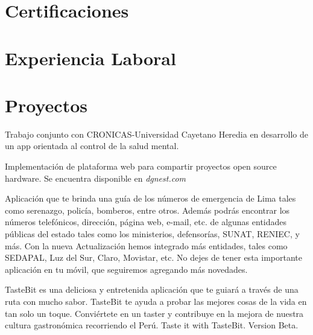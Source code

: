 \documentclass[11pt,a4paper,sans]{moderncv}
\begin{document}
\section{Certificaciones}
{} 

{}  

{}  



\section{Experiencia Laboral}
{} 

{} 

{}  



\section{Proyectos}
{Trabajo conjunto con CRONICAS-Universidad Cayetano Heredia en desarrollo de un app orientada al control de la salud mental.}  

{Implementación de plataforma web para compartir proyectos open source hardware. Se encuentra disponible en \emph{dgnest.com}}  

{Aplicación que te brinda una guía de los números de emergencia de Lima tales como serenazgo, policía, bomberos, entre otros.
Además podrás encontrar los números telefónicos, dirección, página web, e-mail, etc. de algunas entidades públicas del estado tales como los ministerios, defensorías, SUNAT, RENIEC, y más.
Con la nueva Actualización hemos integrado más entidades, tales como SEDAPAL, Luz del Sur, Claro, Movistar, etc.
No dejes de tener esta importante aplicación en tu móvil, que seguiremos agregando más novedades.}  

{TasteBit es una deliciosa y entretenida aplicación que te guiará a través de una ruta con mucho sabor. 
TasteBit te ayuda  a probar las mejores cosas de la vida en tan solo un toque. 
Conviértete en un taster y contribuye en la mejora de nuestra cultura gastronómica recorriendo el Perú.
Taste it with TasteBit.
Version Beta.}  
\end{document}
